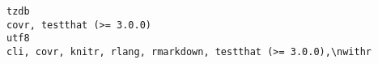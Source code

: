 \documentclass[
  letterpaper,
  DIV=11,
  numbers=noendperiod]{scrreprt}
\begin{document}
\begin{verbatim}
tzdb                                                                                                                                                                                                                                                                                                                                                                                                                                                                                                                                                                                                                                                                                                                                                                                                                                                                                                                                                                                                                                                                                                                                                                                                                                                                                covr, testthat (>= 3.0.0)
utf8                                                                                                                                                                                                                                                                                                                                                                                                                                                                                                                                                                                                                                                                                                                                                                                                                                                                                                                                                                                                                                                                                                                                                                                                                                          cli, covr, knitr, rlang, rmarkdown, testthat (>= 3.0.0),\nwithr

\end{verbatim}
\end{document}
